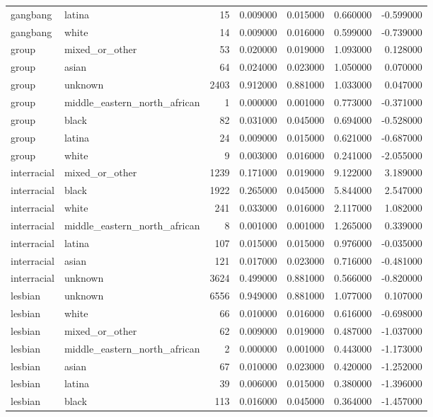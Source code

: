 \begin{tabular}{llrrrrr}
gangbang & latina & 15 & 0.009000 & 0.015000 & 0.660000 & -0.599000 \\
gangbang & white & 14 & 0.009000 & 0.016000 & 0.599000 & -0.739000 \\
group & mixed_or_other & 53 & 0.020000 & 0.019000 & 1.093000 & 0.128000 \\
group & asian & 64 & 0.024000 & 0.023000 & 1.050000 & 0.070000 \\
group & unknown & 2403 & 0.912000 & 0.881000 & 1.033000 & 0.047000 \\
group & middle_eastern_north_african & 1 & 0.000000 & 0.001000 & 0.773000 & -0.371000 \\
group & black & 82 & 0.031000 & 0.045000 & 0.694000 & -0.528000 \\
group & latina & 24 & 0.009000 & 0.015000 & 0.621000 & -0.687000 \\
group & white & 9 & 0.003000 & 0.016000 & 0.241000 & -2.055000 \\
interracial & mixed_or_other & 1239 & 0.171000 & 0.019000 & 9.122000 & 3.189000 \\
interracial & black & 1922 & 0.265000 & 0.045000 & 5.844000 & 2.547000 \\
interracial & white & 241 & 0.033000 & 0.016000 & 2.117000 & 1.082000 \\
interracial & middle_eastern_north_african & 8 & 0.001000 & 0.001000 & 1.265000 & 0.339000 \\
interracial & latina & 107 & 0.015000 & 0.015000 & 0.976000 & -0.035000 \\
interracial & asian & 121 & 0.017000 & 0.023000 & 0.716000 & -0.481000 \\
interracial & unknown & 3624 & 0.499000 & 0.881000 & 0.566000 & -0.820000 \\
lesbian & unknown & 6556 & 0.949000 & 0.881000 & 1.077000 & 0.107000 \\
lesbian & white & 66 & 0.010000 & 0.016000 & 0.616000 & -0.698000 \\
lesbian & mixed_or_other & 62 & 0.009000 & 0.019000 & 0.487000 & -1.037000 \\
lesbian & middle_eastern_north_african & 2 & 0.000000 & 0.001000 & 0.443000 & -1.173000 \\
lesbian & asian & 67 & 0.010000 & 0.023000 & 0.420000 & -1.252000 \\
lesbian & latina & 39 & 0.006000 & 0.015000 & 0.380000 & -1.396000 \\
lesbian & black & 113 & 0.016000 & 0.045000 & 0.364000 & -1.457000 \\

\end{tabular}
